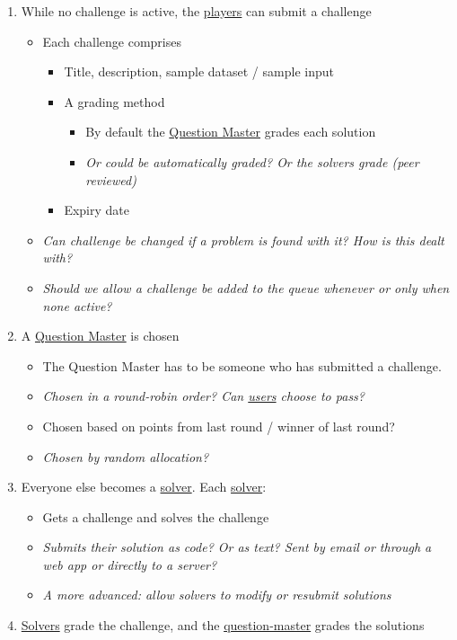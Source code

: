 \documentclass{report}
\begin{document}
\begin{enumerate}
\item While no challenge is active, the \underline{players} can submit a challenge
\begin{itemize}
\item Each challenge comprises
\begin{itemize}
\item Title, description, sample dataset / sample input
\item A grading method
\begin{itemize}
\item By default the \underline{Question Master} grades each solution
\item \emph{Or could be automatically graded? Or the solvers grade (peer reviewed)}
\end{itemize}
\item Expiry date
\end{itemize}
\item \emph{Can challenge be changed if a problem is found with it? How is this dealt with?}
\item \emph{Should we allow a challenge be added to the queue whenever or only when none active?}
\end{itemize}
\item A \underline{Question Master} is chosen
\begin{itemize}
\item The Question Master has to be someone who has submitted a challenge.
\item \emph{Chosen in a round-robin order? Can \underline{users} choose to pass?}
\item Chosen based on points from last round / winner of last round?
\item \emph{Chosen by random allocation?}
\end{itemize}
\item Everyone else becomes a \underline{solver}. Each \underline{solver}:
\begin{itemize}
\item Gets a challenge and solves the challenge
\item \emph{Submits their solution as code? Or as text? Sent by email or through a web app or directly to a server?}
\item \emph{A more advanced: allow solvers to modify or resubmit solutions}
\end{itemize}
\item \underline{Solvers} grade the challenge, and the \underline{question-master} grades the solutions

\end{enumerate}
\end{document}
